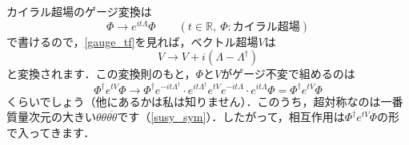 \documentclass[a4paper,uplatex,dvipdfmx]{jsarticle}
\theoremstyle{definition}
\begin{document}
カイラル超場のゲージ変換は
\begin{equation}
  \Phi\rightarrow e^{it\Lambda}\Phi
  \qquad
  (t\in\mathbb{R},\ \Phi:\text{カイラル超場})
\end{equation}
で書けるので，\eqref{gauge_tf}を見れば，ベクトル超場$V$は
\begin{equation}
  V
  \rightarrow
  V
  +
  i(\Lambda-\Lambda^{\dag})
\end{equation}
と変換されます．この変換則のもと，$\Phi$と$V$がゲージ不変で組めるのは
\begin{equation}
  \Phi^{\dag}e^{tV}\Phi
  \rightarrow
  \Phi^{\dag}e^{-it\Lambda^{\dag}}
  \cdot
  e^{it\Lambda^{\dag}}e^{tV}e^{-it\Lambda}
  \cdot
  e^{it\Lambda}\Phi
  =
  \Phi^{\dag}e^{tV}\Phi  
\end{equation}
くらいでしょう（他にあるかは私は知りません）．このうち，超対称なのは一番質量次元の大きい$\theta\theta\overline{\theta\theta}$です（\ref{susy_sym}）．したがって，相互作用は$\Phi^{\dag}e^{tV}\Phi$の形で入ってきます．
\end{document}
